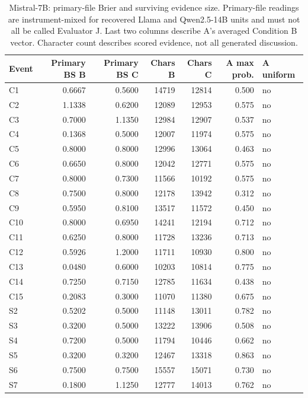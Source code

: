 \begin{table}[!htbp]
\centering\small
\caption{Mistral-7B: primary-file Brier and surviving evidence size. Primary-file readings are instrument-mixed for recovered Llama and Qwen2.5-14B units and must not all be called Evaluator J. Last two columns describe A's averaged Condition B vector. Character count describes scored evidence, not all generated discussion.}
\label{tab:full_primary_mistral7b}
\begin{tabular}{lrrrrrl}
\toprule
Event & Primary BS B & Primary BS C & Chars B & Chars C & A max prob. & A uniform \\
\midrule
C1 & 0.6667 & 0.5600 & 14719 & 12814 & 0.500 & no \\
C2 & 1.1338 & 0.6200 & 12089 & 12953 & 0.575 & no \\
C3 & 0.7000 & 1.1350 & 12984 & 12907 & 0.537 & no \\
C4 & 0.1368 & 0.5000 & 12007 & 11974 & 0.575 & no \\
C5 & 0.8000 & 0.8000 & 12996 & 13064 & 0.463 & no \\
C6 & 0.6650 & 0.8000 & 12042 & 12771 & 0.575 & no \\
C7 & 0.8000 & 0.7300 & 11566 & 10192 & 0.575 & no \\
C8 & 0.7500 & 0.8000 & 12178 & 13942 & 0.312 & no \\
C9 & 0.5950 & 0.8100 & 13517 & 11572 & 0.450 & no \\
C10 & 0.8000 & 0.6950 & 14241 & 12194 & 0.712 & no \\
C11 & 0.6250 & 0.8000 & 11728 & 13236 & 0.713 & no \\
C12 & 0.5926 & 1.2000 & 11711 & 10930 & 0.800 & no \\
C13 & 0.0480 & 0.6000 & 10203 & 10814 & 0.775 & no \\
C14 & 0.7250 & 0.7150 & 12785 & 11634 & 0.438 & no \\
C15 & 0.2083 & 0.3000 & 11070 & 11380 & 0.675 & no \\
S2 & 0.5202 & 0.5000 & 11148 & 13011 & 0.782 & no \\
S3 & 0.3200 & 0.5000 & 13222 & 13906 & 0.508 & no \\
S4 & 0.7200 & 0.5000 & 11794 & 10446 & 0.662 & no \\
S5 & 0.3200 & 0.3200 & 12467 & 13318 & 0.863 & no \\
S6 & 0.7500 & 0.7500 & 15557 & 15071 & 0.730 & no \\
S7 & 0.1800 & 1.1250 & 12777 & 14013 & 0.762 & no \\

\end{tabular}
\end{table}
